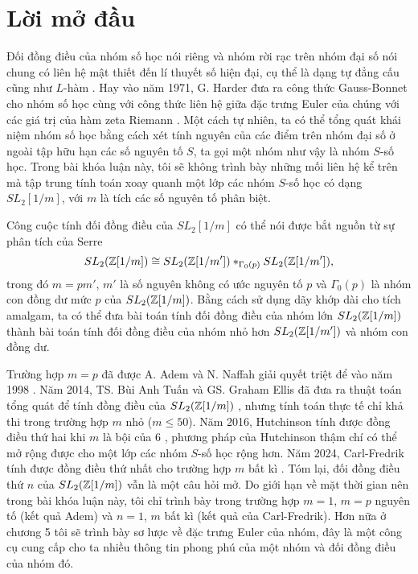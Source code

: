
\chapter*{Lời mở đầu}
Đối đồng điều của nhóm số học nói riêng và nhóm rời rạc trên nhóm đại số nói chung có liên hệ mật thiết đến lí thuyết số hiện đại, cụ thể là dạng tự đẳng cấu cũng như $L$-hàm \cite{VenCohomAriGroup}. Hay vào năm 1971, G. Harder đưa ra công thức Gauss-Bonnet cho nhóm số học cùng với công thức liên hệ giữa đặc trưng Euler của chúng với các giá trị của hàm zeta Riemann \cite{HarderGaussBonnet}. Một cách tự nhiên, ta có thể tổng quát khái niệm nhóm số học bằng cách xét tính nguyên của các điểm trên nhóm đại số ở ngoài tập hữu hạn các số nguyên tố $S$, ta gọi một nhóm như vậy là nhóm $S$-số học. Trong bài khóa luận này, tôi sẽ không trình bày những mối liên hệ kể trên mà tập trung tính toán xoay quanh một lớp các nhóm $S$-số học có dạng $SL_2[1/m]$, với $m$ là tích các số nguyên tố phân biệt.

Công cuộc tính đối đồng điều của $SL_2[1/m]$ có thể nói được bắt nguồn từ sự phân tích của Serre \cite{TreeSerre}
$$
    SL_2(\mathbb Z[1/m]) \cong SL_2(\mathbb Z[1/m']) *_{\Gamma_0(p)} SL_2(\mathbb Z[1/m']),
$$
trong đó $m = pm'$, $m'$ là số nguyên không có ước nguyên tố $p$ và $\Gamma_0(p)$ là nhóm con đồng dư mức $p$ của $SL_2(\mathbb Z[1/m])$. Bằng cách sử dụng dãy khớp dài cho tích amalgam, ta có thể đưa bài toán tính đối đồng điều của nhóm lớn $SL_2(\mathbb Z[1/m])$ thành bài toán tính đối đồng điều của nhóm nhỏ hơn $SL_2(\mathbb Z[1/m'])$ và nhóm con đồng dư.

Trường hợp $m=p$ đã được A. Adem và N. Naffah giải quyết triệt để vào năm 1998 \cite{AdemSL2}. Năm 2014, TS. Bùi Anh Tuấn và GS. Graham Ellis đã đưa ra thuật toán tổng quát để tính đồng điều của $SL_2(\mathbb Z[1/m])$ \cite{TuanHomSL2}, nhưng tính toán thực tế chỉ khả thi trong trường hợp $m$ nhỏ ($m \leq 50$). Năm 2016, Hutchinson tính được đồng điều thứ hai khi $m$ là bội của $6$ \cite{HutchinsonSecondHom}, phương pháp của Hutchinson thậm chí có thể mở rộng được cho một lớp các nhóm $S$-số học rộng hơn. Năm 2024, Carl-Fredrik tính được đồng điều thứ nhất cho trường hợp $m$ bất kì \cite{CarlAbelSL2}. Tóm lại, đối đồng điều thứ $n$ của $SL_2(\mathbb Z[1/m])$ vẫn là một câu hỏi mở. Do giới hạn về mặt thời gian nên trong bài khóa luận này, tôi chỉ trình bày trong trường hợp $m = 1$, $m = p$ nguyên tố (kết quả Adem) và $n=1$, $m$ bất kì (kết quả của Carl-Fredrik). Hơn nữa ở chương 5 tôi sẽ trình bày sơ lược về đặc trưng Euler của nhóm, đây là một công cụ cung cấp cho ta nhiều thông tin phong phú của một nhóm và đối đồng điều của nhóm đó.

